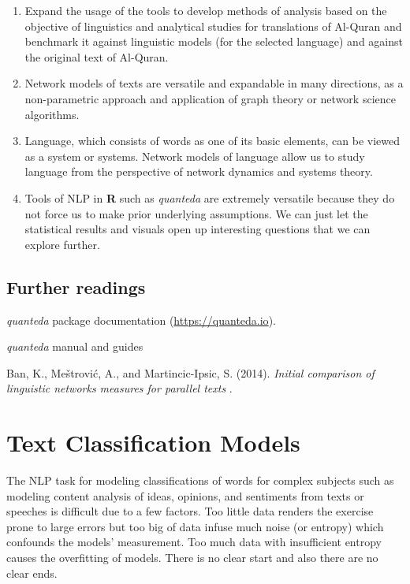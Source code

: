 \documentclass[
]{article}
\begin{document}
\begin{enumerate}
\def\labelenumi{\arabic{enumi}.}
\item
  Expand the usage of the tools to develop methods of analysis based on the objective of linguistics and analytical studies for translations of Al-Quran and benchmark it against linguistic models (for the selected language) and against the original text of Al-Quran.
\item
  Network models of texts are versatile and expandable in many directions, as a non-parametric approach and application of graph theory or network science algorithms.
\item
  Language, which consists of words as one of its basic elements, can be viewed as a system or systems. Network models of language allow us to study language from the perspective of network dynamics and systems theory.
\item
  Tools of NLP in \textbf{R} such as \emph{quanteda} are extremely versatile because they do not force us to make prior underlying assumptions. We can just let the statistical results and visuals open up interesting questions that we can explore further.
\end{enumerate}

\hypertarget{further-readings-6}{%
\subsection{Further readings}\label{further-readings-6}}

\emph{quanteda} package documentation (\url{https://quanteda.io}).

\emph{quanteda} manual and guides \citep{quanteda}

Ban, K., Meštrović, A., and Martincic-Ipsic, S. (2014). \emph{Initial comparison of linguistic networks measures for parallel texts} \citep{ban2014}.

\hypertarget{text-classification-models}{%
\section{Text Classification Models}\label{text-classification-models}}

The NLP task for modeling classifications of words for complex subjects such as modeling content analysis of ideas, opinions, and sentiments from texts or speeches is difficult due to a few factors. Too little data renders the exercise prone to large errors but too big of data infuse much noise (or entropy) which confounds the models' measurement. Too much data with insufficient entropy causes the overfitting of models. There is no clear start and also there are no clear ends.
\end{document}
